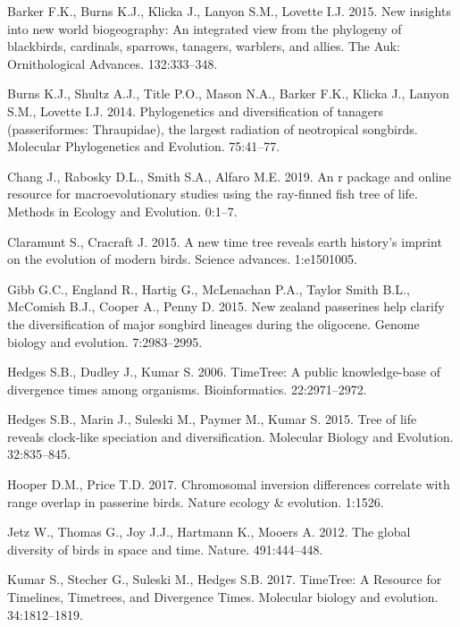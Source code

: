 \documentclass[]{article}
\begin{document}
\leavevmode\hypertarget{ref-barker2015new}{}%
Barker F.K., Burns K.J., Klicka J., Lanyon S.M., Lovette I.J. 2015. New insights into new world biogeography: An integrated view from the phylogeny of blackbirds, cardinals, sparrows, tanagers, warblers, and allies. The Auk: Ornithological Advances. 132:333--348.

\leavevmode\hypertarget{ref-burns2014phylogenetics}{}%
Burns K.J., Shultz A.J., Title P.O., Mason N.A., Barker F.K., Klicka J., Lanyon S.M., Lovette I.J. 2014. Phylogenetics and diversification of tanagers (passeriformes: Thraupidae), the largest radiation of neotropical songbirds. Molecular Phylogenetics and Evolution. 75:41--77.

\leavevmode\hypertarget{ref-chang2019r}{}%
Chang J., Rabosky D.L., Smith S.A., Alfaro M.E. 2019. An r package and online resource for macroevolutionary studies using the ray-finned fish tree of life. Methods in Ecology and Evolution. 0:1--7.

\leavevmode\hypertarget{ref-claramunt2015new}{}%
Claramunt S., Cracraft J. 2015. A new time tree reveals earth history's imprint on the evolution of modern birds. Science advances. 1:e1501005.

\leavevmode\hypertarget{ref-gibb2015new}{}%
Gibb G.C., England R., Hartig G., McLenachan P.A., Taylor Smith B.L., McComish B.J., Cooper A., Penny D. 2015. New zealand passerines help clarify the diversification of major songbird lineages during the oligocene. Genome biology and evolution. 7:2983--2995.

\leavevmode\hypertarget{ref-Hedges2006}{}%
Hedges S.B., Dudley J., Kumar S. 2006. TimeTree: A public knowledge-base of divergence times among organisms. Bioinformatics. 22:2971--2972.

\leavevmode\hypertarget{ref-Hedges2015}{}%
Hedges S.B., Marin J., Suleski M., Paymer M., Kumar S. 2015. Tree of life reveals clock-like speciation and diversification. Molecular Biology and Evolution. 32:835--845.

\leavevmode\hypertarget{ref-hooper2017chromosomal}{}%
Hooper D.M., Price T.D. 2017. Chromosomal inversion differences correlate with range overlap in passerine birds. Nature ecology \& evolution. 1:1526.

\leavevmode\hypertarget{ref-Jetz2012}{}%
Jetz W., Thomas G., Joy J.J., Hartmann K., Mooers A. 2012. The global diversity of birds in space and time. Nature. 491:444--448.

\leavevmode\hypertarget{ref-Kumar2017}{}%
Kumar S., Stecher G., Suleski M., Hedges S.B. 2017. TimeTree: A Resource for Timelines, Timetrees, and Divergence Times. Molecular biology and evolution. 34:1812--1819.
\end{document}
